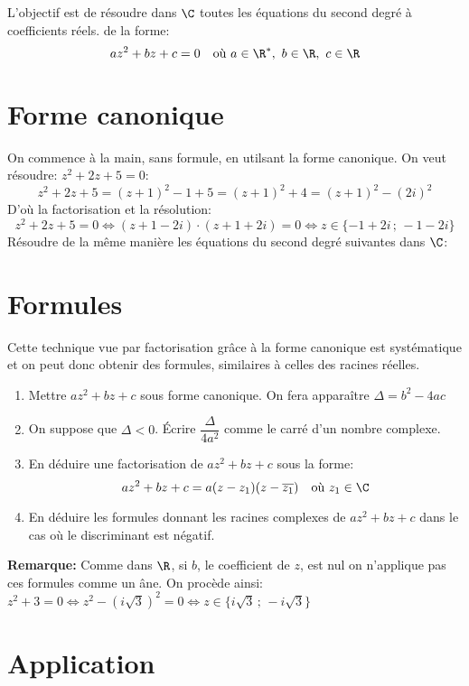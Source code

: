 \documentclass[a4paper]{article}
\begin{document}

\hline
\medskip

L'objectif est de r\'esoudre dans $\C$ toutes les \'equations du
second degr\'e \`a coefficients r\'eels. \ie{} de la forme:
\[az^2+bz+c=0\quad \text{o\`u}\ a\in\R^*,\ b\in\R,\ c\in\R\]
\section{Forme canonique}
On commence \`a la main, sans formule, en utilsant la forme canonique.
\exemple On veut r\'esoudre: $z^2+2z+5=0$:
\[z^2+2z+5=(z+1)^2-1+5=(z+1)^2+4=(z+1)^2-(2i)^2\]
D'o\`u la factorisation et la r\'esolution:
\[ z^2+2z+5=0 \iff \left( z+1-2i\right)\cdot\left(z+1+2i\right)=0 \iff
z\in\{-1+2i\,;\,-1-2i\}\]
R\'esoudre de la m\^eme mani\`ere les \'equations du
second degr\'e suivantes dans $\C$:
\section{Formules}
Cette technique vue par factorisation gr\^ace \`a la forme canonique est
syst\'ematique et on peut donc obtenir des formules, similaires \` a
celles des racines r\'eelles.
\begin{enumerate}
\item Mettre $az^2+bz+c$ sous forme canonique. On fera appara\^itre $\Delta=b^2-4ac$
\item On suppose que $\Delta <0$. \'Ecrire $\dfrac{\Delta}{4a^2}$
  comme le carr\'e d'un nombre complexe.


\item En d\'eduire une factorisation de $az^2+bz+c$ sous la forme:
\[ az^2+bz+c= a(z-z_1)(z-\overline{z_1})\quad \text{o\`u}\ z_1\in\C \]

\item En d\'eduire les formules donnant les racines complexes de
  $az^2+bz+c$ dans le cas o\`u le discriminant est n\'egatif.
\end{enumerate}
\textbf{Remarque:} Comme dans $\R$, si $b$, le coefficient de $z$, est nul on
n'applique pas ces formules comme un \^ane. On proc\`ede ainsi: 
\exemple $z^2+3=0\iff z^2-(i\sqrt3)^2=0 \iff z \in  \{i\sqrt3\,;\,-i\sqrt3\}$
\section{Application}
\end{document}
